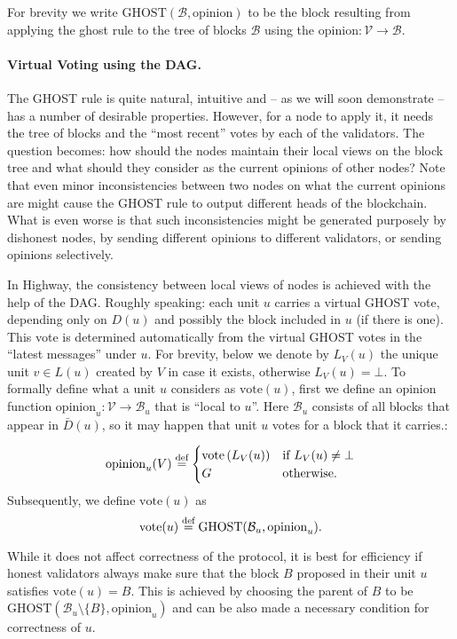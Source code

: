 \documentclass[12pt, fleqn]{article}
\newcommand{\vote}{\mathrm{vote}}
\newcommand{\ghost}{\mathrm{GHOST}}
\newcommand{\opinion}{\mathrm{opinion}}
\newcommand{\defeq}{\stackrel{\textup{def}}{=}}
\newcommand{\cB}{\mathcal{B}}
\newcommand{\cV}{\mathcal{V}}
\newcommand{\inparen}[1]{\left(#1\right)}
\begin{document}
For brevity we write $\ghost(\cB, \opinion)$ to be the block resulting from applying the ghost rule to the tree of blocks $\cB$ using the $\opinion:\cV \to \cB$.

\paragraph{Virtual Voting using the DAG.}

The GHOST rule is quite natural, intuitive and -- as we will soon demonstrate -- has a number of desirable properties.
%
However, for a node to apply it, it needs the tree of blocks and the ``most recent'' votes by each of the validators. 
%
The question becomes: how should the nodes maintain their local views on the block tree and what should they consider as the current opinions of other nodes? 
%
Note that even minor inconsistencies between two nodes on what the current opinions are might cause the GHOST rule to output different heads of the blockchain.
%
What is even worse is that such inconsistencies might be generated purposely by dishonest nodes, by sending different opinions to different validators, or sending opinions selectively.

In Highway, the consistency between local views of nodes is achieved with the help of the DAG.
%
Roughly speaking: each unit $u$ carries a virtual GHOST vote, depending only on $D(u)$ and possibly the block included in $u$ (if there is one). This vote is determined automatically from the virtual GHOST votes in the ``latest messages'' under $u$.
%
For brevity, below we denote by $L_V(u)$ the unique unit $v\in L(u)$ created by $V$ in case it exists, otherwise $L_V(u)=\bot$.
%
To formally define what a unit $u$ considers as $\vote(u)$, first we define an opinion function $\opinion_u: \cV \to \cB_u$ that is ``local to $u$''. Here $\cB_u$ consists of all blocks that appear in $\bar{D}(u)$, so it may happen that unit $u$ votes for a block that it carries.:


$$
    \opinion_u(V) \defeq \begin{cases}
    \vote\inparen{L_V(u)} &\mbox{if }  L_V(u)\neq \bot\\
    G &\mbox{otherwise}.
    \end{cases}
$$
Subsequently, we define $\vote(u)$ as
$$\vote(u) \defeq \ghost(\cB_u, \opinion_u).$$

While it does not affect correctness of the protocol, it is best for efficiency if honest validators always make sure that the block $B$ proposed in their unit $u$ satisfies $\vote(u)=B$.
%
This is achieved by choosing the parent of $B$ to be $\ghost(\cB_u \setminus \{B\}, \opinion_u)$ and can be also made a necessary condition for correctness of $u$.
\end{document}
